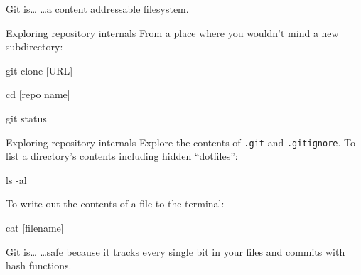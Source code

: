 \begin{frame}{Git is\ldots}
  \hangindent=26pt \huge {
  \ldots a content addressable filesystem.
  }
\end{frame}

\begin{frame}[fragile]{Exploring repository internals}
  From a place where you wouldn't mind a new subdirectory:

  \begin{gitCommand}git clone [URL]\end{gitCommand}

  \begin{gitCommand}cd [repo name]\end{gitCommand}

  \begin{gitCommand}git status\end{gitCommand}

\end{frame}

\begin{frame}[fragile]{Exploring repository internals}
  Explore the contents of \texttt{.git} and \texttt{.gitignore}. To
  list a directory's contents including hidden ``dotfiles'':

  \begin{gitCommand}ls -al\end{gitCommand}

  To write out the contents of a file to the terminal:

  \begin{gitCommand}cat [filename]\end{gitCommand}

\end{frame}

\begin{frame}{Git is\ldots}
  \hangindent=26pt \huge {
  \ldots safe because it tracks every single bit in your files and commits with
  hash functions.
  }
\end{frame}

